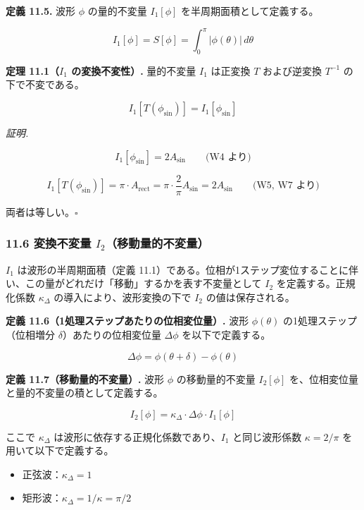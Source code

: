 \documentclass[a4paper,11pt]{ltjsarticle}
\providecommand{\tightlist}{\setlength{\itemsep}{0pt}\setlength{\parskip}{0pt}}
\begin{document}
\textbf{定義 11.5.} 波形 \(\phi\) の量的不変量 \(I_1[\phi]\)
を半周期面積として定義する。

\[I_1[\phi] = S[\phi] = \int_0^{\pi} |\phi(\theta)|\, d\theta \tag{W9}\]

\textbf{定理 11.1（\(I_1\) の変換不変性）.} 量的不変量 \(I_1\) は正変換
\(T\) および逆変換 \(T^{-1}\) の下で不変である。

\[I_1[T(\phi_{\sin})] = I_1[\phi_{\sin}]\]

\emph{証明.}

\[I_1[\phi_{\sin}] = 2A_{\sin} \qquad \text{(W4 より)}\]

\[I_1[T(\phi_{\sin})] = \pi \cdot A_{\text{rect}} = \pi \cdot \frac{2}{\pi} A_{\sin} = 2A_{\sin} \qquad \text{(W5, W7 より)}\]

両者は等しい。\(\square\)

\subsubsection{\texorpdfstring{11.6 変換不変量
\(I_2\)（移動量的不変量）}{11.6 変換不変量 I\_2（移動量的不変量）}}\label{ux5909ux63dbux4e0dux5909ux91cf-i_2ux79fbux52d5ux91cfux7684ux4e0dux5909ux91cf}

\(I_1\) は波形の半周期面積（定義
11.1）である。位相が1ステップ変位することに伴い、この量がどれだけ「移動」するかを表す不変量として
\(I_2\) を定義する。正規化係数 \(\kappa_\Delta\)
の導入により、波形変換の下で \(I_2\) の値は保存される。

\textbf{定義 11.6（1処理ステップあたりの位相変位量）.} 波形
\(\phi(\theta)\) の1処理ステップ（位相増分
\(\delta\)）あたりの位相変位量 \(\Delta\phi\) を以下で定義する。

\[\Delta\phi = \phi(\theta + \delta) - \phi(\theta) \tag{W10}\]

\textbf{定義 11.7（移動量的不変量）.} 波形 \(\phi\) の移動量的不変量
\(I_2[\phi]\) を、位相変位量と量的不変量の積として定義する。

\[I_2[\phi] = \kappa_\Delta \cdot \Delta\phi \cdot I_1[\phi] \tag{W11}\]

ここで \(\kappa_\Delta\) は波形に依存する正規化係数であり、\(I_1\)
と同じ波形係数 \(\kappa = 2/\pi\) を用いて以下で定義する。

\begin{itemize}
\tightlist
\item
  正弦波：\(\kappa_\Delta = 1\)
\item
  矩形波：\(\kappa_\Delta = 1/\kappa = \pi/2\)
\end{itemize}
\end{document}
